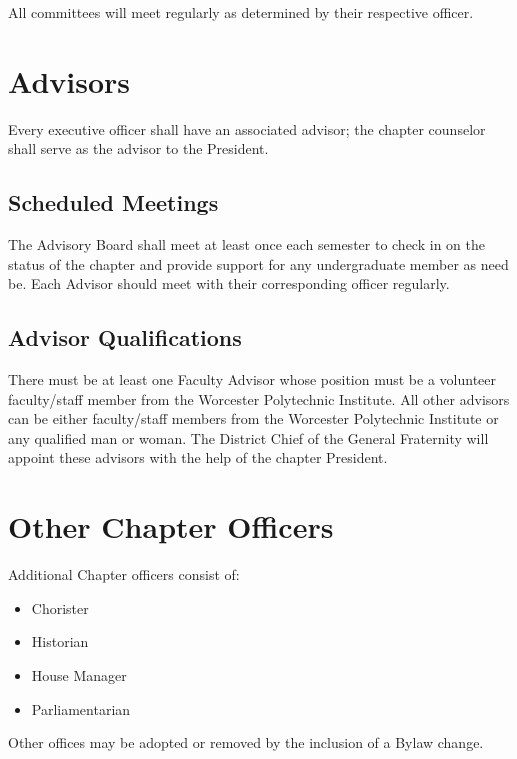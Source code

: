 All committees will meet regularly as determined by their respective officer.

\section{Advisors}
\label{sec:advisors}

Every executive officer shall have an associated advisor; the chapter counselor
shall serve as the advisor to the President.

\subsection{Scheduled Meetings}
\label{sec:advisory-board-scheduled-meetings}

The Advisory Board shall meet at least once each semester to check in on the
status of the chapter and provide support for any undergraduate member as need
be.
Each Advisor should meet with their corresponding officer regularly.

\subsection{Advisor Qualifications}
\label{sec:advisor-qualifications}

There must be at least one Faculty Advisor whose position must be a volunteer
faculty/staff member from the Worcester Polytechnic Institute.
All other advisors can be either faculty/staff members from the Worcester
Polytechnic Institute or any qualified man or woman.
The District Chief of the General Fraternity will appoint these advisors with
the help of the chapter President.

\section{Other Chapter Officers}
\label{sec:other-chapter-officers}

Additional Chapter officers consist of:

\begin{itemize}
	\item Chorister
	\item Historian
	\item House Manager
	\item Parliamentarian
\end{itemize}

Other offices may be adopted or removed by the inclusion of a Bylaw change.


